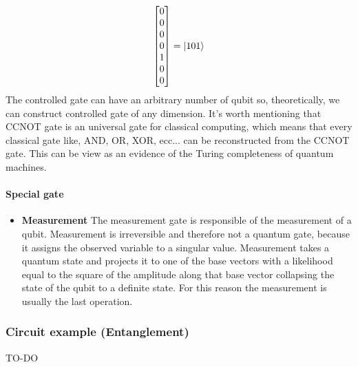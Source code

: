\documentclass[main.tex]{subfiles}
\begin{document}
\begin{itemize}
$$\begin{bmatrix}
	0\\
	0\\
	0\\
	0\\
	1\\
	0\\
	0\\
	\end{bmatrix}
	=
	\ket{101}
	$$
	The controlled gate can have an arbitrary number of qubit so, theoretically, we can construct controlled gate of 
	any dimension. It's worth mentioning that CCNOT gate is an universal gate for classical computing, which means 
	that every classical gate like, AND, OR, XOR, ecc... can be reconstructed from the CCNOT gate. This can be view 
	as an evidence of the Turing completeness of quantum machines.
	\end{itemize}
	
	\paragraph{Special gate}
	\begin{itemize}
	\item \textbf{Measurement} The measurement gate is responsible of the measurement of a qubit. Measurement is irreversible 
	and therefore not a quantum gate, because it assigns the observed variable to a singular value. Measurement takes a quantum state 
	and projects it to one of the base vectors with a likelihood equal to the square of the amplitude along that base vector collapsing 
	the state of the qubit to a definite state. For this reason the measurement is usually the last operation.
	\end{itemize}
	
	\subsubsection{Circuit example (Entanglement)} TO-DO
	
\end{document}
